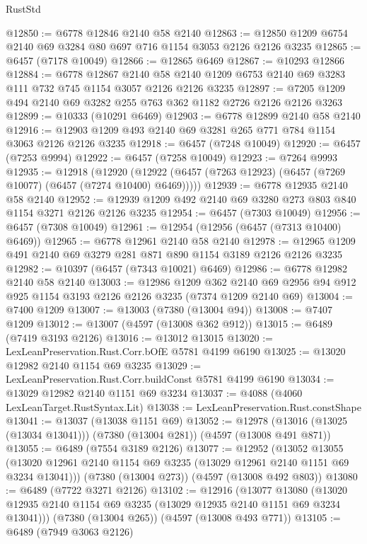 \begin{lexlean}{RustStd}
\begin{coremodule}
@12850 := @6778 @12846 @2140 @58 @2140
@12863 := @12850 @1209 @6754 @2140 @69 @3284 @80 @697 @716 @1154 @3053 @2126 @2126 @3235
@12865 := @6457 (@7178 @10049)
@12866 := @12865 @6469
@12867 := @10293 @12866
@12884 := @6778
    @12867
    @2140
    @58
    @2140
    @1209
    @6753
    @2140
    @69
    @3283
    @111
    @732
    @745
    @1154
    @3057
    @2126
    @2126
    @3235
@12897 := @7205 @1209 @494 @2140 @69 @3282 @255 @763 @362 @1182 @2726 @2126 @2126 @3263
@12899 := @10333 (@10291 @6469)
@12903 := @6778 @12899 @2140 @58 @2140
@12916 := @12903 @1209 @493 @2140 @69 @3281 @265 @771 @784 @1154 @3063 @2126 @2126 @3235
@12918 := @6457 (@7248 @10049)
@12920 := @6457 (@7253 @9994)
@12922 := @6457 (@7258 @10049)
@12923 := @7264 @9993
@12935 := @12918
    (@12920 (@12922 (@6457 (@7263 @12923) (@6457 (@7269 @10077) (@6457 (@7274 @10400) @6469)))))
@12939 := @6778 @12935 @2140 @58 @2140
@12952 := @12939 @1209 @492 @2140 @69 @3280 @273 @803 @840 @1154 @3271 @2126 @2126 @3235
@12954 := @6457 (@7303 @10049)
@12956 := @6457 (@7308 @10049)
@12961 := @12954 (@12956 (@6457 (@7313 @10400) @6469))
@12965 := @6778 @12961 @2140 @58 @2140
@12978 := @12965 @1209 @491 @2140 @69 @3279 @281 @871 @890 @1154 @3189 @2126 @2126 @3235
@12982 := @10397 (@6457 (@7343 @10021) @6469)
@12986 := @6778 @12982 @2140 @58 @2140
@13003 := @12986
    @1209
    @362
    @2140
    @69
    @2956
    @94
    @912
    @925
    @1154
    @3193
    @2126
    @2126
    @3235
    (@7374 @1209 @2140 @69)
@13004 := @7400 @1209
@13007 := @13003 (@7380 (@13004 @94))
@13008 := @7407 @1209
@13012 := @13007 (@4597 (@13008 @362 @912))
@13015 := @6489 (@7419 @3193 @2126)
@13016 := @13012 @13015
@13020 := LexLeanPreservation.Rust.Corr.bOfE @5781 @4199 @6190
@13025 := @13020 @12982 @2140 @1154 @69 @3235
@13029 := LexLeanPreservation.Rust.Corr.buildConst @5781 @4199 @6190
@13034 := @13029 @12982 @2140 @1151 @69 @3234
@13037 := @4088 (@4060 LexLeanTarget.RustSyntax.Lit)
@13038 := LexLeanPreservation.Rust.constShape
@13041 := @13037 (@13038 @1151 @69)
@13052 := @12978 (@13016 (@13025 (@13034 @13041))) (@7380 (@13004 @281)) (@4597 (@13008 @491 @871))
@13055 := @6489 (@7554 @3189 @2126)
@13077 := @12952
    (@13052
      @13055
      (@13020 @12961 @2140 @1154 @69 @3235 (@13029 @12961 @2140 @1151 @69 @3234 @13041)))
    (@7380 (@13004 @273))
    (@4597 (@13008 @492 @803))
@13080 := @6489 (@7722 @3271 @2126)
@13102 := @12916
    (@13077
      @13080
      (@13020 @12935 @2140 @1154 @69 @3235 (@13029 @12935 @2140 @1151 @69 @3234 @13041)))
    (@7380 (@13004 @265))
    (@4597 (@13008 @493 @771))
@13105 := @6489 (@7949 @3063 @2126)

\end{coremodule}
\end{lexlean}
